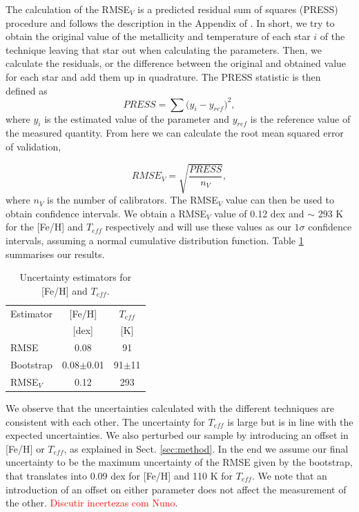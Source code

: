 \documentclass{aa}
\begin{document}
The calculation of the RMSE$_{V}$ is a predicted residual sum of squares (PRESS) procedure \citep{Weisberg-2005} and follows the description in the Appendix of \citet{Rojas-Ayala-2012}. In short, we try to obtain the original value of the metallicity and temperature of each star $i$ of the technique leaving that star out when calculating the parameters. Then, we calculate the residuals, or the difference between the original and obtained value for each star and add them up in quadrature. The PRESS statistic is then defined as 
\begin{equation}
PRESS = \sum{(y_{i}-y_{ref}})^{2},
\end{equation}
where $y_{i}$ is the estimated value of the parameter and $y_{ref}$ is the reference value of the measured quantity. From here we can calculate the root mean squared error of validation,

\begin{equation}
RMSE_{V} = \sqrt{\frac{PRESS}{n_{V}}},
\end{equation}
where $n_{V}$ is the number of calibrators. The RMSE$_{V}$ value can then be used to obtain confidence intervals. We obtain a RMSE$_{V}$ value of 0.12 dex and $\sim$ 293 K for the [Fe/H] and $T_{eff}$ respectively and will use these values as our $1\sigma$ confidence intervals, assuming a normal cumulative distribution function. Table \ref{table:errors} summarises our results. 

\begin{table}[h!]
\centering
\caption[]{Uncertainty estimators for [Fe/H] and $T_{eff}$.}
\label{table:errors}
\begin{tabular}{l c c}
\hline
\hline
Estimator & [Fe/H] & $T_{eff}$ \\ 
                &  [dex]  &  [K] \\
\hline
RMSE & 0.08 & 91\\
Bootstrap & 0.08$\pm$0.01 & 91$\pm$11 \\
RMSE$_{V}$ & 0.12 & 293 \\
\hline
\hline
\end{tabular}
\end{table}

We observe that the uncertainties calculated with the different techniques are consistent with each other. The uncertainty for $T_{eff}$ is large but is in line with the expected uncertainties. We also perturbed our sample by introducing an offset in [Fe/H] or $T_{eff}$, as explained in Sect. \ref{sec:method}. In the end we assume our final uncertainty to be the maximum uncertainty of the RMSE given by the bootstrap, that translates into 0.09 dex for [Fe/H] and 110 K for $T_{eff}$. We note that an introduction of an offset on either parameter does not affect the measurement of the other. \textcolor{red}{Discutir incertezas com Nuno}.   %
\end{document}
